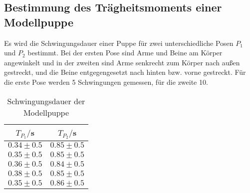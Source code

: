 \subsection{Bestimmung des Trägheitsmoments einer Modellpuppe}
Es wird die Schwingungsdauer einer Puppe für zwei unterschiedliche 
Posen $P_1$ und $P_2$ bestimmt. Bei der ersten Pose sind Arme und Beine am Körper angewinkelt und in der zweiten
sind Arme senkrecht zum Körper nach außen gestreckt, und die Beine entgegengesetzt nach hinten bzw. vorne gestreckt.
Für die erste Pose werden 5 Schwingungen gemessen, für die zweite 10.
\begin{table}[H]
  \centering
  \caption{Schwingungsdauer der Modellpuppe}
  \label{tab:Schwingungsdauer der Modellpuppe}
  \begin{tabular}{c c}
    \toprule
    $T_{P_1}/$s & $T_{P_2}/$s \\
    \midrule
    $0.34 \pm 0.5$ & $0.85 \pm 0.5$ \\
    $0.35 \pm 0.5$ & $0.85 \pm 0.5$ \\
    $0.36 \pm 0.5$ & $0.84 \pm 0.5$ \\
    $0.38 \pm 0.5$ & $0.85 \pm 0.5$ \\
    $0.35 \pm 0.5$ & $0.86 \pm 0.5$ \\
    \bottomrule
  \end{tabular}
\end{table}




